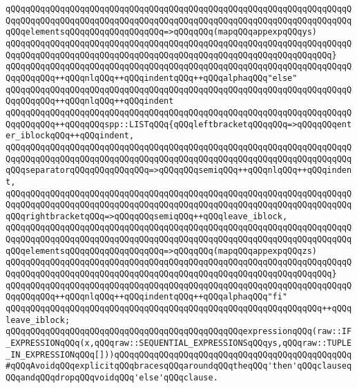 \verb|qQQqqQQqqQQqqQQqqQQqqQQqqQQqqQQqqQQqqQQqqQQqqQQqqQQqqQQqqQQqqQQqqQQqqQQqqQQqqQQqqQQqqQQqqQQqqQQqqQQqqQQqqQQqqQQqqQQqqQQqqQQqqQQqqQQqqQQqqQQqqQQqelementsqQQqqQQqqQQqqQQqqQQq=>qQQqqQQq(mapqQQqappexpqQQqys)|\newline
\verb|qQQqqQQqqQQqqQQqqQQqqQQqqQQqqQQqqQQqqQQqqQQqqQQqqQQqqQQqqQQqqQQqqQQqqQQqqQQqqQQqqQQqqQQqqQQqqQQqqQQqqQQqqQQqqQQqqQQqqQQqqQQqqQQqqQQqqQQq}|\newline
\verb|qQQqqQQqqQQqqQQqqQQqqQQqqQQqqQQqqQQqqQQqqQQqqQQqqQQqqQQqqQQqqQQqqQQqqQQqqQQqqQQq++qQQqnlqQQq++qQQqindentqQQq++qQQqalphaqQQq"else"|\newline
\verb|qQQqqQQqqQQqqQQqqQQqqQQqqQQqqQQqqQQqqQQqqQQqqQQqqQQqqQQqqQQqqQQqqQQqqQQqqQQqqQQq++qQQqnlqQQq++qQQqindent|\newline
\verb|qQQqqQQqqQQqqQQqqQQqqQQqqQQqqQQqqQQqqQQqqQQqqQQqqQQqqQQqqQQqqQQqqQQqqQQqqQQqqQQq++qQQqqQQqspp::LISTqQQq{qQQqleftbracketqQQqqQQq=>qQQqqQQqenter_iblockqQQq++qQQqindent,|\newline
\verb|qQQqqQQqqQQqqQQqqQQqqQQqqQQqqQQqqQQqqQQqqQQqqQQqqQQqqQQqqQQqqQQqqQQqqQQqqQQqqQQqqQQqqQQqqQQqqQQqqQQqqQQqqQQqqQQqqQQqqQQqqQQqqQQqqQQqqQQqqQQqqQQqseparatorqQQqqQQqqQQqqQQq=>qQQqqQQqsemiqQQq++qQQqnlqQQq++qQQqindent,|\newline
\verb|qQQqqQQqqQQqqQQqqQQqqQQqqQQqqQQqqQQqqQQqqQQqqQQqqQQqqQQqqQQqqQQqqQQqqQQqqQQqqQQqqQQqqQQqqQQqqQQqqQQqqQQqqQQqqQQqqQQqqQQqqQQqqQQqqQQqqQQqqQQqqQQqrightbracketqQQq=>qQQqqQQqsemiqQQq++qQQqleave_iblock,|\newline
\verb|qQQqqQQqqQQqqQQqqQQqqQQqqQQqqQQqqQQqqQQqqQQqqQQqqQQqqQQqqQQqqQQqqQQqqQQqqQQqqQQqqQQqqQQqqQQqqQQqqQQqqQQqqQQqqQQqqQQqqQQqqQQqqQQqqQQqqQQqqQQqqQQqelementsqQQqqQQqqQQqqQQqqQQq=>qQQqqQQq(mapqQQqappexpqQQqzs)|\newline
\verb|qQQqqQQqqQQqqQQqqQQqqQQqqQQqqQQqqQQqqQQqqQQqqQQqqQQqqQQqqQQqqQQqqQQqqQQqqQQqqQQqqQQqqQQqqQQqqQQqqQQqqQQqqQQqqQQqqQQqqQQqqQQqqQQqqQQqqQQq}|\newline
\verb|qQQqqQQqqQQqqQQqqQQqqQQqqQQqqQQqqQQqqQQqqQQqqQQqqQQqqQQqqQQqqQQqqQQqqQQqqQQqqQQq++qQQqnlqQQq++qQQqindentqQQq++qQQqalphaqQQq"fi"|\newline
\verb|qQQqqQQqqQQqqQQqqQQqqQQqqQQqqQQqqQQqqQQqqQQqqQQqqQQqqQQqqQQqqQQq++qQQqleave_iblock;|\newline
\newline
\verb|qQQqqQQqqQQqqQQqqQQqqQQqqQQqqQQqqQQqqQQqqQQqqQQqexpressionqQQq(raw::IF_EXPRESSIONqQQq(x,qQQqraw::SEQUENTIAL_EXPRESSIONSqQQqys,qQQqraw::TUPLE_IN_EXPRESSIONqQQq[]))qQQqqQQqqQQqqQQqqQQqqQQqqQQqqQQqqQQqqQQqqQQqqQQq#qQQqAvoidqQQqexplicitqQQqbracesqQQqaroundqQQqtheqQQq'then'qQQqclauseqQQqandqQQqdropqQQqvoidqQQq'else'qQQqclause.|\newline
